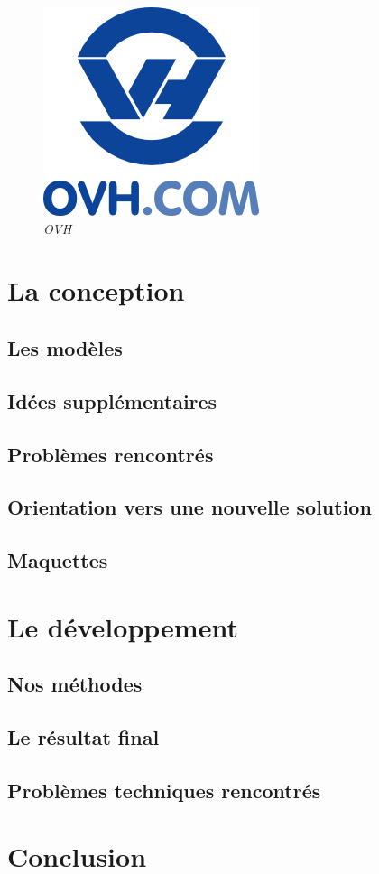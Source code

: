 \documentclass{report}
\begin{document}
\begin{figure}[H]
\begin{center}
\includegraphics[scale=1.2]{ovh.jpg}
\caption{\textit{OVH}}
\end{center}
\end{figure}

\chapter{La conception}

\section{Les modèles}

\section{Idées supplémentaires}

\section{Problèmes rencontrés}

\section{Orientation vers une nouvelle solution}

\section{Maquettes}

\chapter{Le développement}

\section{Nos méthodes}

\section{Le résultat final}

\section{Problèmes techniques rencontrés}


\chapter{Conclusion}
\end{document}
